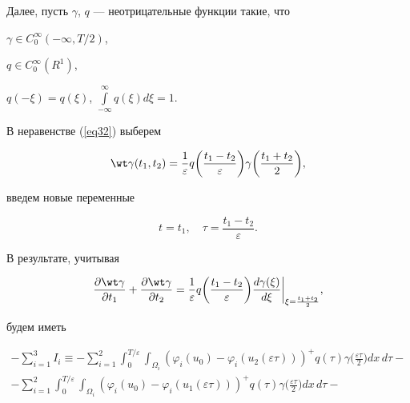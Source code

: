 \begin{pf}
Далее, пусть $\gamma$, $q$ --- неотрицательные функции такие, что 


$\gamma\in C^{\infty}_{0}(-\infty, T/2)$,


$q \in C^{\infty}_{0}(R^{1})$,


$q(-\xi)=q(\xi)$, $\int\limits_{- \infty}^{\infty} q(\xi) d\xi=1$.


В неравенстве (\ref{eq32}) выберем


$$ 


\wt \gamma (t_{1}, t_{2})=\frac{1}{\varepsilon} q


\bigg(\frac{t_{1}-t_{2}}{\varepsilon}\bigg)


\gamma \bigg(\frac{t_{1}+t_{2}}{2}\bigg), 


$$


введем новые переменные


$$ 


t=t_{1}, \quad \tau=\frac{t_{1}-t_{2}}{\varepsilon}. 


$$


В результате, учитывая


$$ 


\frac{\partial \wt \gamma}{\partial t_{1}}+


\frac{\partial \wt \gamma}{\partial t_{2}}=


\frac{1}{\varepsilon} q \bigg (\frac{t_{1}-t_{2}}{\varepsilon} \bigg) 


{\frac{d \gamma(\xi)}{d \xi}} \bigg|_{\xi=\frac{t_{1}+t_{2}}{2}}, 


$$


будем иметь


\begin{multline} 


\label{eq33} 


-\sum_{i=1}^{3} I_{i} \equiv 


-\sum_{i=1}^{2} \int_{0}^{T / \varepsilon} \int_{\Omega_{i}} 


({\varphi_{i}(u_{0})-\varphi_{i}(u_{2}(\varepsilon \tau))})^{+}


q(\tau) \gamma \bigg(\frac{\varepsilon \tau}{2}\bigg) dx\, d \tau- \\


%


-\sum_{i=1}^{2} \int_{0}^{T / \varepsilon} \int_{\Omega_{i}} 


({\varphi_{i}(u_{0})-\varphi_{i}(u_{1}(\varepsilon \tau))})^{+}


q(\tau) \gamma \bigg(\frac{\varepsilon \tau}{2}\bigg) dx\, d \tau- \\



\end{multline}
\end{pf}
